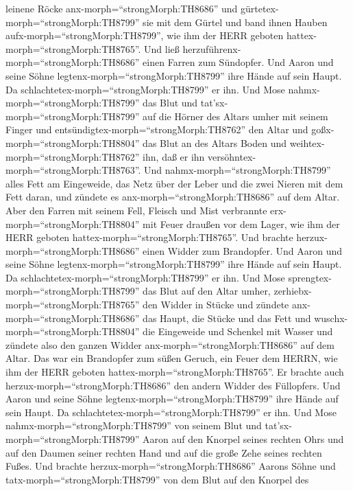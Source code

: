 leinene Röcke anx-morph=``strongMorph:TH8686'' und
gürtetex-morph=``strongMorph:TH8799'' sie mit dem Gürtel und band ihnen
Hauben aufx-morph=``strongMorph:TH8799'', wie ihm der HERR geboten
hattex-morph=``strongMorph:TH8765''.  Und ließ
herzuführenx-morph=``strongMorph:TH8686'' einen Farren zum Sündopfer.
Und Aaron und seine Söhne legtenx-morph=``strongMorph:TH8799'' ihre
Hände auf sein Haupt.  Da
schlachtetex-morph=``strongMorph:TH8799'' er ihn. Und Mose
nahmx-morph=``strongMorph:TH8799'' das Blut und
tat'sx-morph=``strongMorph:TH8799'' auf die Hörner des Altars umher mit
seinem Finger und entsündigtex-morph=``strongMorph:TH8762'' den Altar
und goßx-morph=``strongMorph:TH8804'' das Blut an des Altars Boden und
weihtex-morph=``strongMorph:TH8762'' ihn, daß er ihn
versöhntex-morph=``strongMorph:TH8763''.  Und
nahmx-morph=``strongMorph:TH8799'' alles Fett am Eingeweide, das Netz
über der Leber und die zwei Nieren mit dem Fett daran, und zündete es
anx-morph=``strongMorph:TH8686'' auf dem Altar.  Aber den
Farren mit seinem Fell, Fleisch und Mist verbrannte
erx-morph=``strongMorph:TH8804'' mit Feuer draußen vor dem Lager, wie
ihm der HERR geboten hattex-morph=``strongMorph:TH8765''. 
Und brachte herzux-morph=``strongMorph:TH8686'' einen Widder zum
Brandopfer. Und Aaron und seine Söhne
legtenx-morph=``strongMorph:TH8799'' ihre Hände auf sein Haupt.
 Da schlachtetex-morph=``strongMorph:TH8799'' er ihn. Und
Mose sprengtex-morph=``strongMorph:TH8799'' das Blut auf den Altar
umher,  zerhiebx-morph=``strongMorph:TH8765'' den Widder in
Stücke und zündete anx-morph=``strongMorph:TH8686'' das Haupt, die
Stücke und das Fett  und
wuschx-morph=``strongMorph:TH8804'' die Eingeweide und Schenkel mit
Wasser und zündete also den ganzen Widder
anx-morph=``strongMorph:TH8686'' auf dem Altar. Das war ein Brandopfer
zum süßen Geruch, ein Feuer dem HERRN, wie ihm der HERR geboten
hattex-morph=``strongMorph:TH8765''.  Er brachte auch
herzux-morph=``strongMorph:TH8686'' den andern Widder des Füllopfers.
Und Aaron und seine Söhne legtenx-morph=``strongMorph:TH8799'' ihre
Hände auf sein Haupt.  Da
schlachtetex-morph=``strongMorph:TH8799'' er ihn. Und Mose
nahmx-morph=``strongMorph:TH8799'' von seinem Blut und
tat'sx-morph=``strongMorph:TH8799'' Aaron auf den Knorpel seines rechten
Ohrs und auf den Daumen seiner rechten Hand und auf die große Zehe
seines rechten Fußes.  Und brachte
herzux-morph=``strongMorph:TH8686'' Aarons Söhne und
tatx-morph=``strongMorph:TH8799'' von dem Blut auf den Knorpel des
